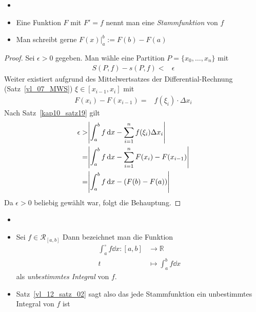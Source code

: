 \begin{Bemerkung}{
	\begin{itemize}
		\item[ ]
		\item Eine Funktion $F$ mit $F'=f$ nennt man eine \emph{Stammfunktion} 
		von $f$
		\item Man schreibt gerne $F(x) \vert_a^b := F(b) -F(a)$
	\end{itemize}
}\end{Bemerkung}

\begin{proof}
	Sei $\epsilon >0 $ gegeben. Man wähle eine Partition $P = \{x_0, \hdots, x_n\}$ 
	mit 
	\begin{align*}
		S(P,f) - s(P,f) < & \epsilon
	\end{align*}
	Weiter existiert aufgrund des Mittelwertsatzes der Differential-Rechnung
	(Satz~\ref{vl_07_MWS}) 
	$\xi \in [x_{i-1}, x_i]$ mit 
	\begin{align*}
		F(x_i) - F(x_{i-1}) = &  f(\xi_i) \cdot \Delta x_i
	\end{align*}
	Nach Satz~\ref{kap10_satz19}
	gilt 
	\begin{align*}
		\epsilon > & \abs{ \int_a^b f \dd{x} - \sum_{i=1}^n f(\xi_i) \Delta x_i} \\
		= & \abs{ \int_a^b f \dd{x} - \sum_{i=1}^n F(x_i) -F(x_{i-1})} \\
		= & \abs{ \int_a^b f \dd{x} - (F(b) -F(a))}
	\end{align*}
	Da $\epsilon > 0$ beliebig gewählt war, folgt die Behauptung.	
\end{proof}

\begin{Bemerkung}{
	\begin{itemize}
	\item[ ]
		\item Sei $f \in \mathcal{R}_{[a,b]}$ Dann bezeichnet man die Funktion 
		\begin{align*}
			\int_a^{\circ} f\dd{x} :  [a,b]  & \rightarrow \mathbb{R} \\
			 t & \mapsto \int_a^b f\dd{x}
		\end{align*}
		als \emph{unbestimmtes Integral} von $f$.
		\item Satz~\ref{vl_12_satz_02}
		sagt also das jede Stammfunktion ein unbestimmtes Integral von $f$ ist 
	\end{itemize}
}\end{Bemerkung}

